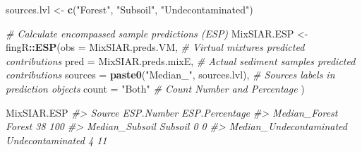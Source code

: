 \documentclass[
]{article}
\newenvironment{Shaded}{\begin{snugshade}}{\end{snugshade}}
\newcommand{\AttributeTok}[1]{\textcolor[rgb]{0.13,0.29,0.53}{#1}}
\newcommand{\CommentTok}[1]{\textcolor[rgb]{0.56,0.35,0.01}{\textit{#1}}}
\newcommand{\FunctionTok}[1]{\textcolor[rgb]{0.13,0.29,0.53}{\textbf{#1}}}
\newcommand{\NormalTok}[1]{#1}
\newcommand{\OtherTok}[1]{\textcolor[rgb]{0.56,0.35,0.01}{#1}}
\newcommand{\SpecialCharTok}[1]{\textcolor[rgb]{0.81,0.36,0.00}{\textbf{#1}}}
\newcommand{\StringTok}[1]{\textcolor[rgb]{0.31,0.60,0.02}{#1}}
\begin{document}
\begin{Shaded}
\begin{Highlighting}[]
\NormalTok{sources.lvl }\OtherTok{\textless{}{-}} \FunctionTok{c}\NormalTok{(}\StringTok{"Forest"}\NormalTok{, }\StringTok{"Subsoil"}\NormalTok{, }\StringTok{"Undecontaminated"}\NormalTok{)}

\CommentTok{\# Calculate encompassed sample predictions (ESP)}
\NormalTok{MixSIAR.ESP }\OtherTok{\textless{}{-}}\NormalTok{ fingR}\SpecialCharTok{::}\FunctionTok{ESP}\NormalTok{(}\AttributeTok{obs =}\NormalTok{ MixSIAR.preds.VM,                   }\CommentTok{\# Virtual mixtures predicted contributions}
                          \AttributeTok{pred =}\NormalTok{ MixSIAR.preds.mixE,                }\CommentTok{\# Actual sediment samples predicted contributions}
                          \AttributeTok{sources =} \FunctionTok{paste0}\NormalTok{(}\StringTok{"Median\_"}\NormalTok{, sources.lvl), }\CommentTok{\# Sources labels in prediction objects}
                          \AttributeTok{count =} \StringTok{"Both"}                            \CommentTok{\# Count \textquotesingle{}Number\textquotesingle{} and \textquotesingle{}Percentage\textquotesingle{}}
\NormalTok{                          )}
\end{Highlighting}
\end{Shaded}

\begin{Shaded}
\begin{Highlighting}[]
\NormalTok{MixSIAR.ESP}
\CommentTok{\#\textgreater{}                                   Source ESP.Number ESP.Percentage}
\CommentTok{\#\textgreater{} Median\_Forest                     Forest         38            100}
\CommentTok{\#\textgreater{} Median\_Subsoil                   Subsoil          0              0}
\CommentTok{\#\textgreater{} Median\_Undecontaminated Undecontaminated          4             11}
\end{Highlighting}
\end{Shaded}
\end{document}
